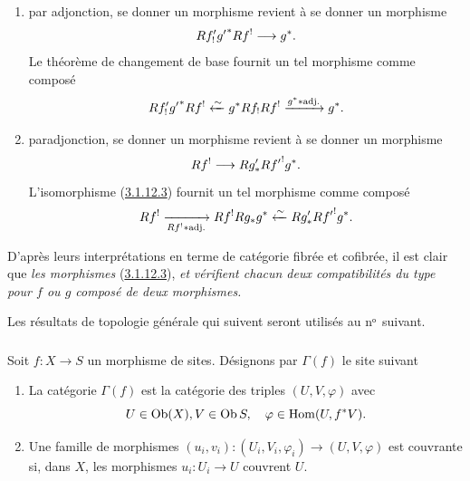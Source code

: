 \documentclass[10pt]{../fichiers-configuration-latex/smfart}
\begin{document}
\begin{enumerate}
\renewcommand{\theenumi}{\alph{enumi}}
\renewcommand{\labelenumi}{\theenumi)}
\item par adjonction, se donner un morphisme  revient à se
donner un morphisme
$$
Rf'_{!}{g'}^{\ast}Rf^{!}\longrightarrow g^{\ast}{}.
$$
Le théorème de changement de base fournit un tel morphisme comme
composé
$$
Rf'_{!}{g'}^{\ast}Rf^{!}\xleftarrow{\sim}
g^{\ast}Rf_{!}Rf^{!}\xrightarrow{g^{\ast}\ast \text{adj.}} g^{\ast}{}.
$$

\item par\pageoriginale adjonction, se donner un morphisme 
revient à se donner un morphisme
$$
Rf^{!}\longrightarrow Rg'_{\ast}R{f'}^{!}g^{\ast}{}.
$$
L'isomorphisme (\hyperref[XVIII.cor3.1.12.3]{3.1.12.3}) fournit un tel morphisme comme composé
$$
Rf^{!}\xrightarrow[Rf^{!}\ast \text{adj.}]{} Rf^{!}Rg_{\ast}
g^{\ast}\xleftarrow{\sim} Rg'_{\ast}R{f'}^{!}g^{\ast}{}.
$$
\end{enumerate}

D'après leurs interprétations en terme de catégorie fibrée et
cofibrée, il est clair que \emph{les morphismes} (\hyperref[XVIII.cor3.1.12.3]{3.1.12.3}),
 \emph{et}  \emph{vérifient chacun deux
compatibilités du type}  \emph{pour $f$ ou $g$ composé de deux
morphismes.}

Les résultats de topologie générale qui suivent seront utilisés au
nᵒ suivant.

\subsubsection{}
Soit $f:X\rightarrow S$ un morphisme de sites. Désignons par
$\Gamma(f)$ le site suivant
\begin{enumerate}
\renewcommand{\theenumi}{\alph{enumi}}
\renewcommand{\labelenumi}{\theenumi)}
\item La catégorie $\Gamma(f)$ est la catégorie des triples
$(U,V,\varphi)$ avec
$$
U\in \operatorname{Ob} (X), V\in \operatorname{Ob} S,\quad \varphi\in \operatorname{Hom}
(U,f^{\ast}V){}.
$$

\item Une famille de morphismes
$(u_{i},v_{i}):(U_{i},V_{i},\varphi_{i})\rightarrow (U,V,\varphi)$ est
couvrante si, dans $X$, les morphismes $u_{i}:U_{i}\rightarrow U$
couvrent $U$.
\end{enumerate}
\end{document}
